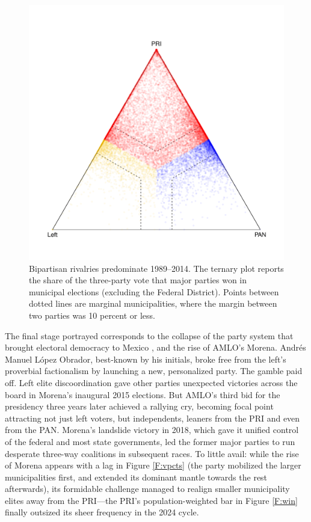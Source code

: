 \documentclass[letter,12pt]{article}
\begin{document}
\begin{figure}
  \centering
  \includegraphics[width=.6\columnwidth]{../../plots/triplot1989-2014-v-mu.pdf}
  \caption{Bipartisan rivalries predominate 1989--2014. The ternary plot reports the share of the three-party vote that major parties won in municipal elections (excluding the Federal District). Points between dotted lines are marginal municipalities, where the margin between two parties was 10 percent or less.}\label{F:triplot}
\end{figure}

The final stage portrayed corresponds to the collapse of the party system that brought electoral democracy to Mexico \citep{estevez.magar.rosas.2008,moreno.decisElec.2009}, and the rise of AMLO's Morena. Andrés Manuel López Obrador, best-known by his initials, broke free from the left's proverbial factionalism \citep{bruhn.1997} by launching a new, personalized party. The gamble paid off. Left elite discoordination gave other parties unexpected victories across the board in Morena's inaugural 2015 elections. But AMLO's third bid for the presidency three years later achieved a rallying cry, becoming focal point attracting not just left voters, but independents, leaners from the PRI and even from the PAN. Morena's landslide victory in 2018, which gave it unified control of the federal and most state governments, led the former major parties to run desperate three-way coalitions in subsequent races. To little avail: while the rise of Morena appears with a lag in Figure \ref{F:vpcts} (the party mobilized the larger municipalities first, and extended its dominant mantle towards the rest afterwards), its formidable challenge managed to realign smaller municipality elites away from the PRI---the PRI's population-weighted bar in Figure \ref{F:win} finally outsized its sheer frequency in the 2024 cycle.
\end{document}
